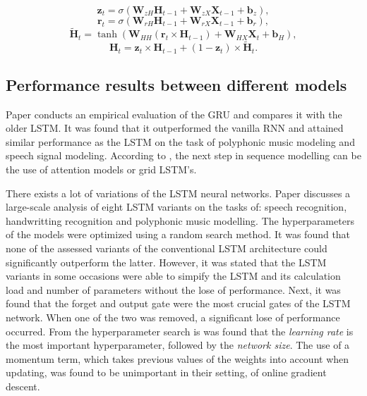 \begin{equation}
	\textbf{z}_{t} = \sigma(\textbf{W}_{zH}\textbf{H}_{t-1}+\textbf{W}_{zX}\textbf{X}_{t-1}+\textbf{b}_{z}),
\end{equation}
\begin{equation}
	\textbf{r}_{t} = \sigma(\textbf{W}_{rH}\textbf{H}_{t-1}+\textbf{W}_{rX}\textbf{X}_{t-1}+\textbf{b}_{r}),
\end{equation}
\begin{equation}
	\tilde{\textbf{H}}_{t}=\tanh(\textbf{W}_{HH}(\textbf{r}_t\times\textbf{H}_{t-1})+\textbf{W}_{HX}\textbf{X}_t+\textbf{b}_H),
\end{equation}
\begin{equation}
	\textbf{H}_t=\textbf{z}_t\times\textbf{H}_{t-1}+(1-\textbf{z}_t)\times\tilde{\textbf{H}}_t.
\end{equation}

\subsection{Performance results between different models}\label{s:Performance results between different models}
Paper \cite{Chung2014} conducts an empirical evaluation of the GRU and compares it with the older LSTM. It was found that it outperformed the vanilla RNN and attained similar performance as the LSTM on the task of polyphonic music modeling and speech signal modeling. 
According to \cite{Olah}, the next step in sequence modelling can be the use of attention models or grid LSTM's.

There exists a lot of variations of the LSTM neural networks. Paper \cite{Greff2017} discusses a large-scale analysis of eight LSTM variants on the tasks of: speech recognition, handwritting recognition and polyphonic music modelling. The hyperparameters of the models were optimized using a random search method. It was found that none of the assessed variants of the conventional LSTM architecture could significantly outperform the latter. However, it was stated that the LSTM variants in some occasions were able to simpify the LSTM and its calculation load and number of parameters without the lose of performance.  Next, it was found that the forget and output gate were the most crucial gates of the LSTM network. When one of the two was removed, a significant lose of performance occurred. From the hyperparameter search is was found that the \textit{learning rate} is the most important hyperparameter, followed by the \textit{network size}. The use of a momentum term, which takes previous values of the weights into account when updating, was found to be unimportant in their setting, of online gradient descent. 

